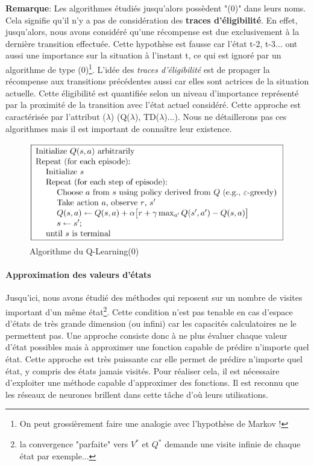 \noindent \textbf{Remarque}: Les algorithmes étudiés jusqu'alors possèdent "(0)" dans leurs noms. Cela signifie qu'il n'y a pas de considération des \textbf{traces d'éligibilité}. En effet, jusqu'alors, nous avons considéré qu'une récompense est due exclusivement à la dernière transition effectuée. Cette hypothèse est fausse car l'état t-2, t-3... ont aussi une importance sur la situation à l'instant t, ce qui est ignoré par un algorithme de type (0)\footnote{On peut grossièrement faire une analogie avec l'hypothèse de Markov !}. L'idée des \textit{traces d'éligibilité} est de propager la récompense aux transitions précédentes aussi car elles sont actrices de la situation actuelle. Cette éligibilité est quantifiée selon un niveau d'importance représenté par la proximité de la transition avec l'état actuel considéré. Cette approche est caractérisée par l'attribut ($\lambda$) (Q($\lambda$), TD($\lambda$)...). Nous ne détaillerons pas ces algorithmes mais il est important de connaître leur existence.

\begin{figure}
    \centering
    \includegraphics[scale=0.4]{./tex/reinforcement-learning/algo_Q-learning.png}
    \caption{Algorithme du Q-Learning(0)}
    \label{qalgo}
\end{figure}

\paragraph{Approximation des valeurs d'états}
Jusqu'ici, nous avons étudié des méthodes qui reposent sur un nombre de visites important d'un même  état\footnote{la convergence "parfaite" vers $V^*$ et $Q^*$ demande une visite infinie de chaque état par exemple...}. Cette condition n'est pas tenable en cas d'espace d'états de très grande dimension (ou infini) car les capacités calculatoires ne le permettent pas. Une approche consiste donc à ne plus évaluer chaque valeur d'état possibles mais à approximer une fonction capable de prédire n'importe quel état. Cette approche est très puissante car elle permet de prédire n'importe quel état, y compris des états jamais visités. Pour réaliser cela, il est nécessaire d'exploiter une méthode capable d'approximer des fonctions. Il est reconnu que les réseaux de neurones brillent dans cette tâche d'où leurs utilisations.\\

